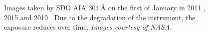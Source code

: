 \documentclass[11pt,a4paper,onecolumn]{report}
\begin{document}
\begin{figure}[t]%
  \centering
  \qquad
  \qquad
  \caption[]{Images taken by SDO AIA $\SI[]{304}[]{\angstrom}$ on the first of January in 2011
    , 2015  and 2019
    . Due to the degradation of the instrument, the
    exposure reduces over time. \textit{Images courtesy of NASA.}}
  \label{fig:aia_degradation}
\end{figure}
\end{document}
